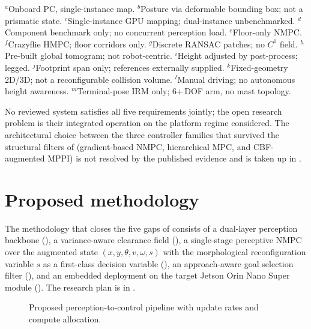 \documentclass[11pt,a4paper]{article}
\begin{document}
\begin{table}[htbp]
\vspace{3pt}
\begin{flushleft}\scriptsize
$^{a}$Onboard PC, single-instance map.\quad
$^{b}$Posture via deformable bounding box; not a prismatic state.\quad
$^{c}$Single-instance GPU mapping; dual-instance unbenchmarked.\quad
$^{d}$Component benchmark only; no concurrent perception load.\quad
$^{e}$Floor-only NMPC.\quad
$^{f}$Crazyflie HMPC; floor corridors only.\quad
$^{g}$Discrete RANSAC patches; no $C^1$ field.\quad
$^{h}$Pre-built global tomogram; not robot-centric.\quad
$^{i}$Height adjusted by post-process; legged.\quad
$^{j}$Footprint span only; references externally supplied.\quad
$^{k}$Fixed-geometry 2D/3D; not a reconfigurable collision volume.\quad
$^{l}$Manual driving; no autonomous height awareness.\quad
$^{m}$Terminal-pose IRM only; 6+\,DOF arm, no mast topology.
\end{flushleft}
\end{table}

No reviewed system satisfies all five requirements jointly; the open research problem is their integrated operation on the platform regime considered. The architectural choice between the three controller families that survived the structural filters of  (gradient-based NMPC, hierarchical MPC, and CBF-augmented MPPI) is not resolved by the published evidence and is taken up in .

\section{Proposed methodology}
\label{sec:proposed-methodology}

The methodology that closes the five gaps of  consists of a dual-layer perception backbone (), a variance-aware clearance field (), a single-stage perceptive NMPC over the augmented state $(x, y, \theta, v, \omega, s)$ with the morphological reconfiguration variable $s$ as a first-class decision variable (), an approach-aware goal selection filter (), and an embedded deployment on the target Jetson Orin Nano Super module (). The research plan is in .

\begin{figure}[!htbp]
  \centering
  \resizebox{\linewidth}{!}{}
  \caption{Proposed perception-to-control pipeline with update rates and compute allocation.}
  \label{fig:pipeline}
\end{figure}
\end{document}

